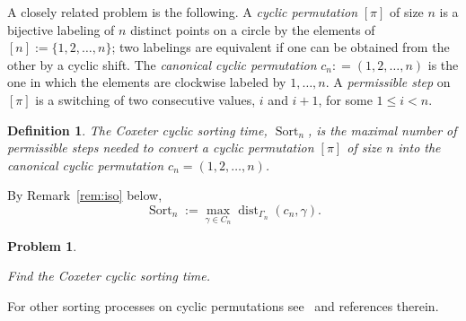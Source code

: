 \documentclass[11pt]{amsart}
\newtheorem{problem}[theorem]{Problem}
\newtheorem{definition}[theorem]{Definition}
\numberwithin{equation}{section}
\newcommand{\todo}[1]{\vspace{5 mm}\par \noindent
\marginpar{\textsc{ToDo}} \framebox{\begin{minipage}[c]{0.95
\textwidth}
 #1 \end{minipage}}\vspace{5 mm}\par}
\newcommand{\dist}{{\operatorname{dist}}}
\newcommand{\Sort}{{\operatorname{Sort}}}
\begin{document}

A closely related problem is the following. 
A {\em cyclic permutation} $[\pi]$ of size $n$ is 
a bijective labeling of $n$ distinct points on a circle 
by the elements of $[n] := \{1, 2,\dots, n\}$; two labelings are equivalent if one can be obtained from the other by a cyclic shift. 
 The {\em canonical cyclic permutation} $c_n: = (1, 2, \dots , n)$ is the one in which the elements are clockwise labeled by $1,\dots,n$. 
A {\it permissible step} on $[\pi]$ is a switching of two consecutive values, $i$ and $i+1$, for some $1 \le i < n$. 


\begin{definition}\label{df:2}
     The {\em  Coxeter cyclic sorting time}, $\Sort_n$,  is the  maximal number of permissible steps needed to convert a cyclic permutation $[\pi]$ of size $n$ into the canonical cyclic permutation $c_n = (1, 2, \dots , n)$.  
\end{definition}

     By Remark~\ref{rem:iso} below, 
    \[
        \Sort_n
        := \max_{\gamma\in C_n} \dist_{\Gamma_n}(c_n, \gamma). 
    \]   

\begin{problem}\label{pb:2}



    Find the  Coxeter cyclic sorting time. 

\end{problem}

For other sorting processes on cyclic permutations see~\cite{AAR} and references therein. 
\end{document}
